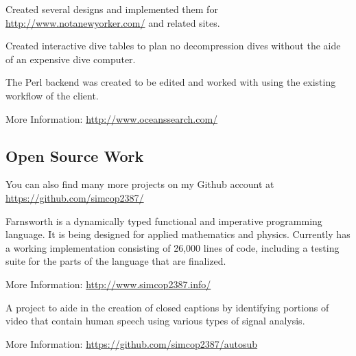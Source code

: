 \documentclass[table,tmargin=1in,bmargin=1in,letterpaper]{resume}
\begin{document}
\begin{compactitem}
\item Created several designs and implemented them for \url{http://www.notanewyorker.com/} and related sites.
\end{compactitem}


\begin{compactitem}
\item Created interactive dive tables to plan no decompression dives without the aide of an expensive dive computer.
\item The Perl backend was created to be edited and worked with using the existing workflow of the client.
\item More Information: \url{http://www.oceanssearch.com/}
\end{compactitem}

\vspace{0.2in}

\subsection{Open Source Work}

\begin{compactitem}
\item You can also find many more projects on my Github account at \url{https://github.com/simcop2387/}
\end{compactitem}


\begin{compactitem}
\item Farnsworth is a dynamically typed functional and imperative programming language.  
It is being designed for applied mathematics and physics.  Currently has a working implementation 
consisting of 26,000 lines of code, including a testing suite for the parts of the language that are finalized.
\item More Information: \url{http://www.simcop2387.info/}
\end{compactitem}


\begin{compactitem}
\item A project to aide in the creation of closed captions by identifying portions of 
video that contain human speech using various types of signal analysis.
\item More Information: \url{https://github.com/simcop2387/autosub}
\end{compactitem}
\end{document}
